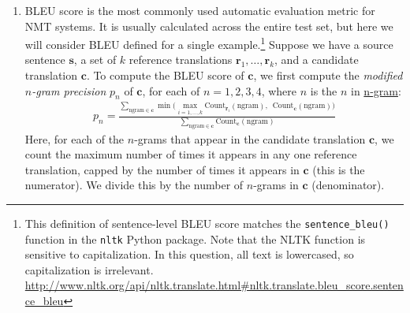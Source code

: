 \documentclass{assignment format}
\newenvironment{answer}{
    {\bf Answer:} \begingroup\color{red}
}{\endgroup}%
\begin{document}
\begin{enumerate}[label=(\alph*)]
\begin{enumerate}[label=(\roman*)]
    \item explain ONE advantage and disadvantage of dot product attention ($\mathbf{s}^T \mathbf{h}_i$) compared to multiplicative attention ($\mathbf{s}^T\mathbf{W}\mathbf{h}_i$).
    \begin{answer}
    \end{answer}
    \item explain ONE advantage and disadvantage of dot product attention ($\mathbf{s}^T \mathbf{h}_i$) compared to additive attention ($\mathbf{v}^T \tanh(\mathbf{W_1} \mathbf{h_i}+\mathbf{W_2} \mathbf{s_t})$).
    \begin{answer}
    \end{answer}
\end{enumerate}
\item BLEU score is the most commonly used automatic evaluation metric for NMT systems. It is usually calculated across the entire test set, but here we will consider BLEU defined for a single example.\footnote{This definition of sentence-level BLEU score matches the \texttt{sentence\_bleu()} function in the \texttt{nltk} Python package. Note that the NLTK function is sensitive to capitalization. In this question, all text is lowercased, so capitalization is irrelevant. \\ \url{http://www.nltk.org/api/nltk.translate.html\#nltk.translate.bleu_score.sentence_bleu}
    }
    Suppose we have a source sentence $\mathbf{s}$, a set of $k$ reference translations $\mathbf{r}_1,\dots,\mathbf{r}_k$, and a candidate translation $\mathbf{c}$. To compute the BLEU score of $\mathbf{c}$, we first compute the \textit{modified $n$-gram precision} $p_n$ of $\mathbf{c}$, for each of $n=1,2,3,4$, where $n$ is the $n$ in \href{https://en.wikipedia.org/wiki/N-gram}{n-gram}:
    \begin{align}
        p_n = \frac{ \displaystyle \sum_{\text{ngram} \in \mathbf{c}} \min \bigg( \max_{i=1,\dots,k} \text{Count}_{\mathbf{r}_i}(\text{ngram}), \enspace \text{Count}_{\mathbf{c}}(\text{ngram}) \bigg) }{\displaystyle \sum_{\text{ngram}\in \mathbf{c}} \text{Count}_{\mathbf{c}}(\text{ngram})}
    \end{align}
     Here, for each of the $n$-grams that appear in the candidate translation $\mathbf{c}$, we count the maximum number of times it appears in any one reference translation, capped by the number of times it appears in $\mathbf{c}$ (this is the numerator). We divide this by the number of $n$-grams in $\mathbf{c}$ (denominator). \newline 


\end{enumerate}
\end{document}

